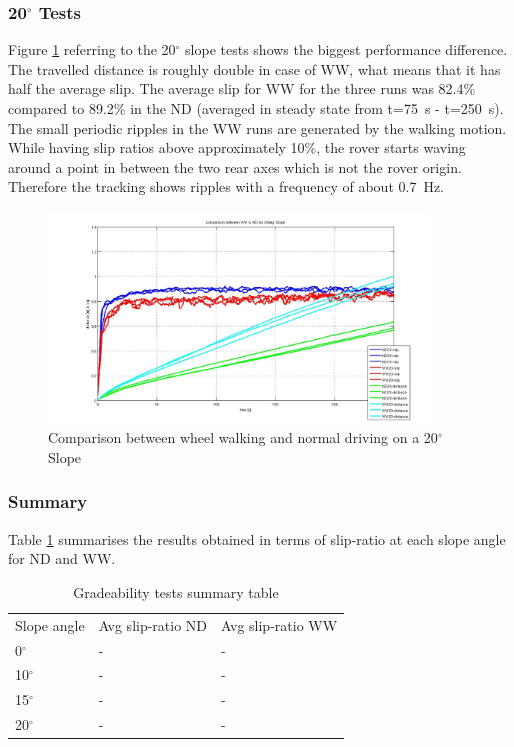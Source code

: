 \documentclass[a4paper,twocolumn]{esapub2005} %
\begin{document}
\subsubsection*{20$^{\circ}$ Tests}
Figure \ref{fig:20d} referring to the 20$^\circ$ slope tests shows the biggest performance difference. The travelled distance is roughly double in case of WW, what means that it has half the average slip. The average slip for WW for the three runs was 82.4\% compared to 89.2\% in the ND (averaged in steady state
from t=75~\unit{s} - t=250~\unit{s}).
The small periodic ripples in the WW runs are generated by the walking motion. While having slip ratios above approximately 10\%, the rover starts waving around a point in between the two rear axes which is not the rover origin. Therefore the tracking shows ripples with a frequency of about 0.7~\unit{Hz}.

\begin{figure}[h!]
    \centering
    \includegraphics[width=0.9\textwidth]{20d.jpg}	\caption{Comparison between
    wheel walking and normal driving on a 20$^{\circ}$ Slope} \label{fig:20d}
\end{figure}

\subsubsection*{Summary}
Table \ref{tab:SlopeSummaryTable} summarises the results obtained in terms of slip-ratio at each slope angle for ND and WW.

\begin{table}[h]
	\begin{tabular}{lll}
	Slope angle & Avg slip-ratio ND & Avg slip-ratio WW \\
	0$^{\circ}$       & -                 & -                 \\
	10$^{\circ}$      & -                 & -                 \\
	15$^{\circ}$      & -                 & -                 \\
	20$^{\circ}$      & -                 & -                
	\end{tabular}
	\caption{Gradeability tests summary table}
	\label{tab:SlopeSummaryTable}
\end{table}
\end{document}
